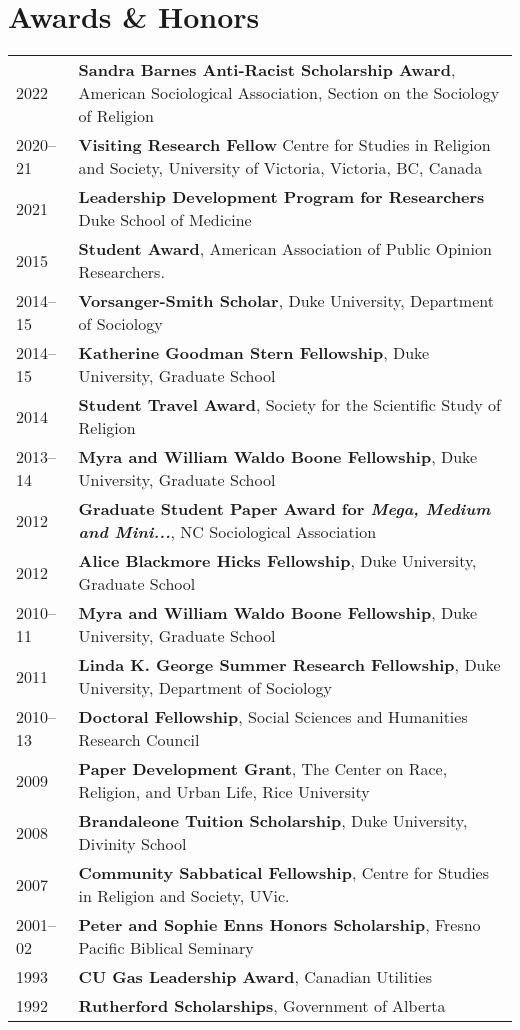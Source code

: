 \section*{Awards \& Honors}

\begin{longtable}{p{} p{}}
2022  & \textbf{Sandra Barnes Anti-Racist Scholarship Award}, American Sociological Association, Section on the Sociology of Religion\\
2020--21 & \textbf{Visiting Research Fellow} Centre for Studies in Religion and Society, University of Victoria, Victoria, BC, Canada \\
2021 & \textbf{Leadership Development Program for Researchers} Duke School of Medicine\\
2015 & \textbf{Student Award}, American Association of Public Opinion Researchers.\\
2014--15 & \textbf{Vorsanger-Smith Scholar}, Duke University, Department of Sociology\\
2014--15 & \textbf{Katherine Goodman Stern Fellowship}, Duke University, Graduate School\\
2014 & \textbf{Student Travel Award}, Society for the Scientific Study of Religion\\
2013--14 & \textbf{Myra and William Waldo Boone Fellowship}, Duke University, Graduate School\\
2012 & \textbf{Graduate Student Paper Award for \emph{Mega, Medium and Mini...}}, NC Sociological Association\\
2012 & \textbf{Alice Blackmore Hicks Fellowship}, Duke University, Graduate School\\
2010--11 & \textbf{Myra and William Waldo Boone Fellowship}, Duke University, Graduate School\\
2011 & \textbf{Linda K. George Summer Research Fellowship}, Duke University, Department of Sociology\\
2010--13 & \textbf{Doctoral Fellowship}, Social Sciences and Humanities Research Council\\
2009 & \textbf{Paper Development Grant}, The Center on Race, Religion, and Urban Life, Rice University\\
2008 & \textbf{Brandaleone Tuition Scholarship}, Duke University, Divinity School\\
2007 & \textbf{Community Sabbatical Fellowship}, Centre for Studies in Religion and Society, UVic.\\
2001--02 & \textbf{Peter and Sophie Enns Honors Scholarship}, Fresno Pacific Biblical Seminary\\
1993 & \textbf{CU Gas Leadership Award}, Canadian Utilities\\
1992 & \textbf{Rutherford Scholarships}, Government of Alberta\\
\end{longtable}
